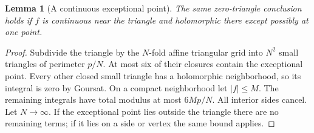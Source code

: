 \documentclass[11pt,a4paper,openany]{book}
\newtheorem{lemma}[theorem]{Lemma}
\theoremstyle{definition}
\theoremstyle{remark}\newtheorem{remark}[theorem]{Remark}
\begin{document}
\begin{lemma}[A continuous exceptional point]\label{d12:04:exceptional-point}
The same zero-triangle conclusion holds if \(f\) is continuous near the
triangle and holomorphic there except possibly at one point.
\end{lemma}
\begin{proof}
Subdivide the triangle by the \(N\)-fold affine triangular grid into
\(N^2\) small triangles of perimeter \(p/N\).
At most six of their closures contain the exceptional point. Every other
closed small triangle has a holomorphic neighborhood, so its integral
is zero by Goursat. On a compact neighborhood let \(|f|\le M\).
The remaining integrals have total modulus at most \(6Mp/N\).
All interior sides cancel. Let \(N\to\infty\).
If the exceptional point lies outside the triangle there are no remaining
terms; if it lies on a side or vertex the same bound applies.
\end{proof}
\end{document}
